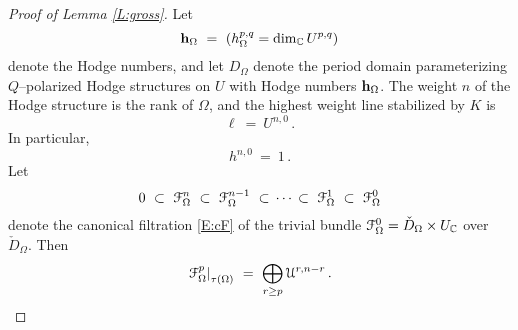 \documentclass[12pt]{amsart}
\numberwithin{equation}{section}
\numberwithin{table}{section}
\numberwithin{figure}{section}
\begin{document}
\begin{proof}[Proof of Lemma \ref{L:gross}]
Let
\[
  \mathbf{h}_\Omega \ = \ (h^{p,q}_\Omega = \mathrm{dim}_\mathbb C\,U^{p,q})
\]
denote the Hodge numbers, and let $D_\Omega$ denote the period domain parameterizing $Q$--polarized Hodge structures on $U$ with Hodge numbers $\mathbf{h}_\Omega$.  The weight $n$ of the Hodge structure is the rank of $\Omega$, and the highest weight line stabilized by $K$ is 
\begin{equation}\label{E:ell}
  \ell \ = \ U^{n,0} \,.
\end{equation}
In particular, 
\begin{equation}\label{E:h=1}
  h^{n,0} \ = \ 1 \,.
\end{equation}
Let 
\[
  0 \ \subset \ \cF^n_\Omega \ \subset \ \cF^{n-1}_\Omega \ \subset \,\cdots\,
  \subset \ \cF^1_\Omega \ \subset \ \cF^0_\Omega 
\]
denote the canonical filtration \eqref{E:cF} of the trivial bundle $\mathcal F^0_\Omega = \check D_\Omega \times U_\mathbb C$ over $\check D_\Omega$.  Then
\[
  \left.\cF^p_\Omega\right|_{\tau(\Omega)} \ = \ 
  \bigoplus_{r\ge p} \cU^{r,n-r} \,.
\]


\end{proof}
\end{document}
